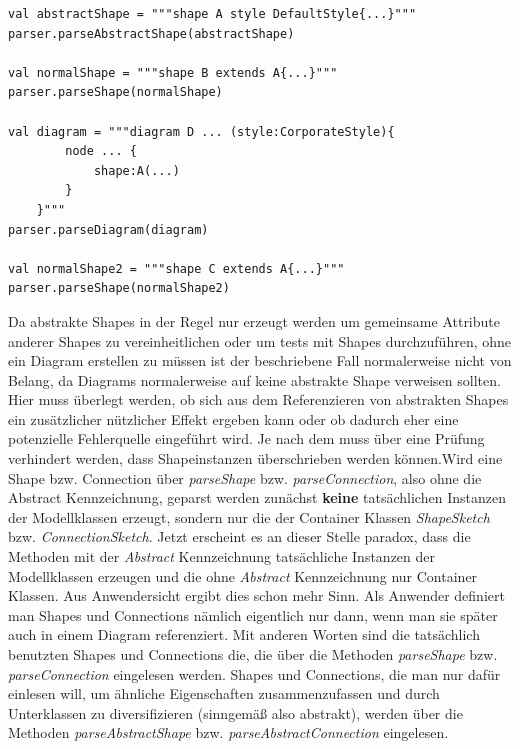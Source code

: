 \begin{lstlisting}[style = scala, caption = {Beispiel Aufrufe zum Provozieren einer möglicherweise ungewollten Situation durch Vererbung}, label = {lst:beispielabstractshape}]
val abstractShape = """shape A style DefaultStyle{...}"""
parser.parseAbstractShape(abstractShape)

val normalShape = """shape B extends A{...}"""
parser.parseShape(normalShape)

val diagram = """diagram D ... (style:CorporateStyle){
		node ... {
			shape:A(...)
		}
	}"""
parser.parseDiagram(diagram)

val normalShape2 = """shape C extends A{...}"""
parser.parseShape(normalShape2)
\end{lstlisting} Da abstrakte Shapes in der Regel nur erzeugt werden um gemeinsame Attribute anderer Shapes zu vereinheitlichen oder um tests mit Shapes durchzuführen, ohne ein Diagram erstellen zu müssen ist der beschriebene Fall normalerweise nicht von Belang, da Diagrams normalerweise auf keine abstrakte Shape verweisen sollten. Hier muss überlegt werden, ob sich aus dem Referenzieren von abstrakten Shapes ein zusätzlicher nützlicher Effekt ergeben kann oder ob dadurch eher eine potenzielle Fehlerquelle eingeführt wird. Je nach dem muss über eine Prüfung verhindert werden, dass Shapeinstanzen überschrieben werden können.\linebreak Wird eine Shape bzw. Connection über \textit{parseShape} bzw. \textit{parseConnection}, also ohne die Abstract Kennzeichnung, geparst werden zunächst \textbf{keine} tatsächlichen Instanzen der Modellklassen erzeugt, sondern nur die der Container Klassen \textit{ShapeSketch} bzw. \textit{ConnectionSketch}. Jetzt erscheint es an dieser Stelle paradox, dass die Methoden mit der \textit{Abstract} Kennzeichnung tatsächliche Instanzen der Modellklassen erzeugen und die ohne \textit{Abstract} Kennzeichnung nur Container Klassen. Aus Anwendersicht ergibt dies schon mehr Sinn. Als Anwender definiert man Shapes und Connections nämlich eigentlich nur dann, wenn man sie später auch in einem Diagram referenziert. Mit anderen Worten sind die tatsächlich benutzten Shapes und Connections die, die über die Methoden \textit{parseShape} bzw. \textit{parseConnection} eingelesen werden. Shapes und Connections, die man nur dafür einlesen will, um ähnliche Eigenschaften zusammenzufassen und durch Unterklassen zu diversifizieren (sinngemäß also abstrakt), werden über die Methoden \textit{parseAbstractShape} bzw. \textit{parseAbstractConnection} eingelesen.
